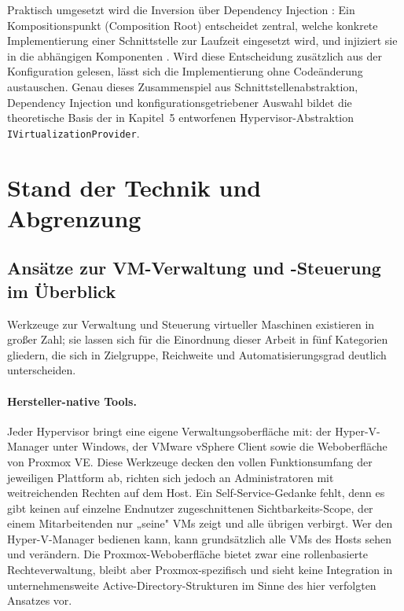 \documentclass[12pt,a4paper]{article}
\begin{document}
Praktisch umgesetzt wird die Inversion über Dependency Injection \parencite{fowler2004ioc}: Ein Kompositionspunkt (Composition Root) entscheidet zentral, welche konkrete Implementierung einer Schnittstelle zur Laufzeit eingesetzt wird, und injiziert sie in die abhängigen Komponenten \parencite{microsoft-aspnetcore-di}. Wird diese Entscheidung zusätzlich aus der Konfiguration gelesen, lässt sich die Implementierung ohne Codeänderung austauschen. Genau dieses Zusammenspiel aus Schnittstellenabstraktion, Dependency Injection und konfigurationsgetriebener Auswahl bildet die theoretische Basis der in Kapitel~5 entworfenen Hypervisor-Abstraktion \texttt{IVirtualizationProvider}.

\newpage
\section{Stand der Technik und Abgrenzung}

\subsection{Ansätze zur VM-Verwaltung und -Steuerung im Überblick}
\label{sec:stand-ueberblick}

Werkzeuge zur Verwaltung und Steuerung virtueller Maschinen existieren in großer Zahl; sie lassen sich für die Einordnung dieser Arbeit in fünf Kategorien gliedern, die sich in Zielgruppe, Reichweite und Automatisierungsgrad deutlich unterscheiden.

\paragraph{Hersteller-native Tools.} Jeder Hypervisor bringt eine eigene Verwaltungsoberfläche mit: der Hyper-V-Manager unter Windows, der VMware vSphere Client sowie die Weboberfläche von Proxmox VE. Diese Werkzeuge decken den vollen Funktionsumfang der jeweiligen Plattform ab, richten sich jedoch an Administratoren mit weitreichenden Rechten auf dem Host. Ein Self-Service-Gedanke fehlt, denn es gibt keinen auf einzelne Endnutzer zugeschnittenen Sichtbarkeits-Scope, der einem Mitarbeitenden nur „seine" VMs zeigt und alle übrigen verbirgt. Wer den Hyper-V-Manager bedienen kann, kann grundsätzlich alle VMs des Hosts sehen und verändern. Die Proxmox-Weboberfläche bietet zwar eine rollenbasierte Rechteverwaltung, bleibt aber Proxmox-spezifisch und sieht keine Integration in unternehmensweite Active-Directory-Strukturen im Sinne des hier verfolgten Ansatzes vor.
\end{document}
